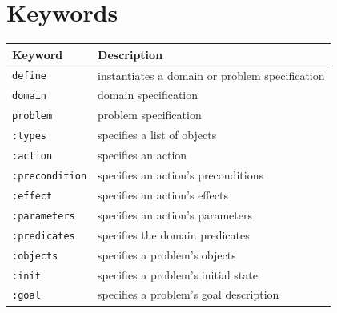 \documentclass[
a4paper, %
11pt, %
onecolumn, %
openany, %
]{memoir}
\begin{document}
{\section{Keywords}
\begin{center}
\begin{tabular}{ l  l }
Keyword    & Description\\
\hline
\hline
\texttt{define}  & instantiates a domain or problem specification\\
\hline
\texttt{domain}  & domain specification \\
\hline
\texttt{problem} & problem specification \\
\hline
\texttt{:types}  & specifies a list of objects \\
\hline
\texttt{:action} & specifies an action \\
\hline
\texttt{:precondition} & specifies an action's preconditions \\
\hline
\texttt{:effect} & specifies an action's effects\\
\hline
\texttt{:parameters} & specifies an action's parameters\\
\hline
\texttt{:predicates} & specifies the domain predicates \\
\hline
\texttt{:objects} & specifies a problem's objects\\
\hline
\texttt{:init} & specifies a problem's initial state\\
\hline
\texttt{:goal} & specifies a problem's goal description\\
\hline
\end{tabular}
\end{center}

}
\backmatter








\end{document}
